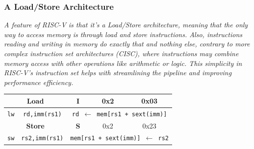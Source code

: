 \subsubsection{A Load/Store Architecture}
\textit{A feature of RISC-V is that it's a Load/Store architecture, meaning that the only way to access memory is through load and store instructions. Also, instructions reading and writing in memory do exactly that and nothing else, contrary to more complex instruction set architectures (CISC), where instructions may combine memory access with other operations like arithmetic or logic. This simplicity in RISC-V's instruction set helps with streamlining the pipeline and improving performance efficiency.} \\ \vspace*{5px}

\begin{center}
    \begin{tabular}{|c|c|c|c|c|}
        \hline
        \multicolumn{2}{|c|}{\textbf{Load}} & \textbf{I} & 0x2 & 0x03 \\ 
        \hline
        \texttt{lw} & \texttt{rd,imm(rs1)} & \multicolumn{3}{c|}{\texttt{rd $\leftarrow$ mem[rs1 + sext(imm)]}} \\ 
        \hline
        \multicolumn{2}{|c|}{\textbf{Store}} & \textbf{S} & 0x2 & 0x23 \\ 
        \hline
        \texttt{sw} & \texttt{rs2,imm(rs1)} & \multicolumn{3}{c|}{\texttt{mem[rs1 + sext(imm)] $\leftarrow$ rs2}} \\ 
        \hline
    \end{tabular}
\end{center}

